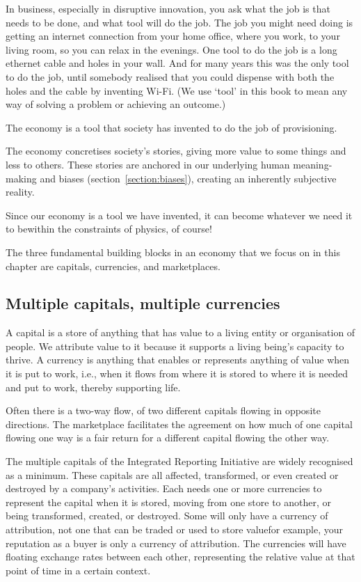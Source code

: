 In business, especially in disruptive innovation, you ask what the job is that needs to be done, and what tool will do the job\cite{christensen-dna}. The job you might need doing is getting an internet connection from your home office, where you work, to your living room, so you can relax in the evenings. One tool to do the job is a long ethernet cable and holes in your wall. And for many years this was the only tool to do the job, until somebody realised that you could dispense with both the holes and the cable by inventing Wi-Fi. (We use ‘tool’ in this book to mean any way of solving a problem or achieving an outcome.)


The economy is a tool that society has invented to do the job of provisioning.


The economy concretises society's stories, giving more value to some things and less to others. These stories are anchored in our underlying human meaning\hyp{}making and biases (section~\ref{section:biases}), creating an inherently subjective reality. 


Since our economy is a tool we have invented, it can become whatever we need it to be\textemdash within the constraints of physics, of course!


The three fundamental building blocks in an economy that we focus on in this chapter are capitals, currencies, and marketplaces. 
\subsection{Multiple capitals, multiple currencies}
\label{section:six-capitals}


A capital is a store of anything that has value to a living entity or organisation of people. We attribute value to it because it supports a living being's capacity to thrive. A currency is anything that enables or represents anything of value when it is put to work, i.e., when it flows from where it is stored to where it is needed and put to work, thereby supporting life.


Often there is a two-way flow, of two different capitals flowing in opposite directions. The marketplace facilitates the agreement on how much of one capital flowing one way is a fair return for a different capital flowing the other way.


The multiple capitals of the Integrated Reporting Initiative are widely recognised as a minimum.
These capitals are all affected, transformed, or even created or destroyed by a company's activities. Each needs one or more currencies to represent the capital when it is stored, moving from one store to another, or being transformed, created, or destroyed. Some will only have a currency of attribution, not one that can be traded or used to store value\textemdash for example, your reputation as a buyer is only a currency of attribution. The currencies will have floating exchange rates between each other, representing the relative value at that point of time in a certain context.



